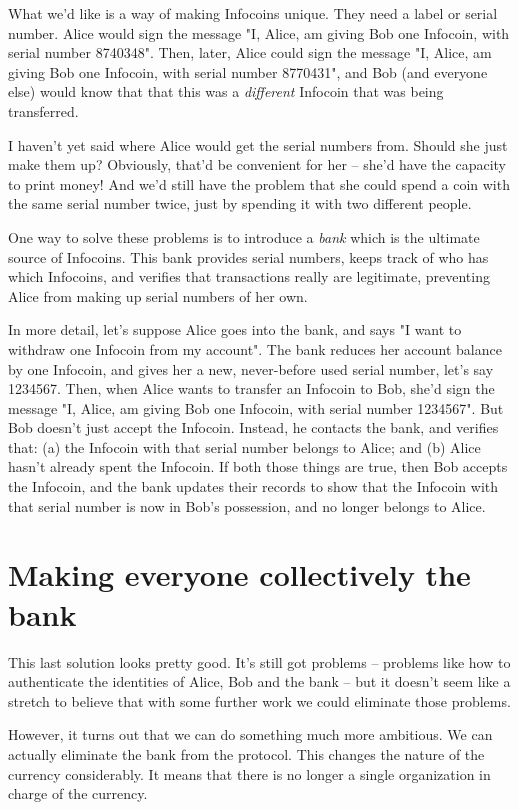 \documentclass[12pt]{book}
\newcounter{problem}[chapter]
\begin{document}
What we'd like is a way of making Infocoins unique.  They need a label
or serial number.  Alice would sign the message "I, Alice, am giving
Bob one Infocoin, with serial number 8740348".  Then, later, Alice
could sign the message "I, Alice, am giving Bob one Infocoin, with
serial number 8770431", and Bob (and everyone else) would know that
that this was a \emph{different} Infocoin that was being transferred.

I haven't yet said where Alice would get the serial numbers from.
Should she just make them up?  Obviously, that'd be convenient for her
-- she'd have the capacity to print money!  And we'd still have the
problem that she could spend a coin with the same serial number twice,
just by spending it with two different people.

One way to solve these problems is to introduce a \emph{bank} which is
the ultimate source of Infocoins.  This bank provides serial numbers,
keeps track of who has which Infocoins, and verifies that transactions
really are legitimate, preventing Alice from making up serial numbers
of her own.

In more detail, let's suppose Alice goes into the bank, and says "I
want to withdraw one Infocoin from my account".  The bank reduces her
account balance by one Infocoin, and gives her a new, never-before
used serial number, let's say 1234567.  Then, when Alice wants to
transfer an Infocoin to Bob, she'd sign the message "I, Alice, am
giving Bob one Infocoin, with serial number 1234567".  But Bob doesn't
just accept the Infocoin.  Instead, he contacts the bank, and verifies
that: (a) the Infocoin with that serial number belongs to Alice; and
(b) Alice hasn't already spent the Infocoin.  If both those things are
true, then Bob accepts the Infocoin, and the bank updates their
records to show that the Infocoin with that serial number is now in
Bob's possession, and no longer belongs to Alice.

\section{Making everyone collectively the bank}

This last solution looks pretty good.  It's still got problems --
problems like how to authenticate the identities of Alice, Bob and the
bank -- but it doesn't seem like a stretch to believe that with some
further work we could eliminate those problems.

However, it turns out that we can do something much more ambitious.
We can actually eliminate the bank from the protocol.  This changes
the nature of the currency considerably.  It means that there is no
longer a single organization in charge of the currency.
\end{document}
